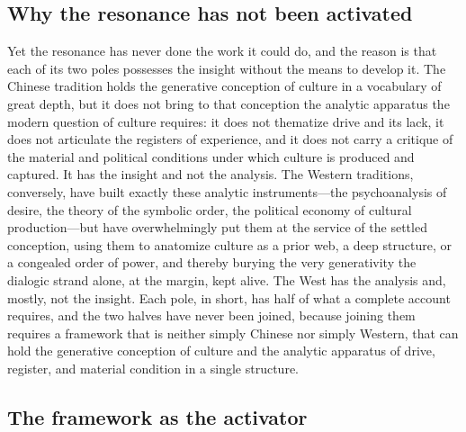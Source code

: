 \subsection*{Why the resonance has not been activated}

Yet the resonance has never done the work it could do, and the reason is that each of its two poles possesses the insight without the means to develop it. The Chinese tradition holds the generative conception of culture in a vocabulary of great depth, but it does not bring to that conception the analytic apparatus the modern question of culture requires: it does not thematize drive and its lack, it does not articulate the registers of experience, and it does not carry a critique of the material and political conditions under which culture is produced and captured. It has the insight and not the analysis. The Western traditions, conversely, have built exactly these analytic instruments---the psychoanalysis of desire, the theory of the symbolic order, the political economy of cultural production---but have overwhelmingly put them at the service of the settled conception, using them to anatomize culture as a prior web, a deep structure, or a congealed order of power, and thereby burying the very generativity the dialogic strand alone, at the margin, kept alive. The West has the analysis and, mostly, not the insight. Each pole, in short, has half of what a complete account requires, and the two halves have never been joined, because joining them requires a framework that is neither simply Chinese nor simply Western, that can hold the generative conception of culture and the analytic apparatus of drive, register, and material condition in a single structure.

\subsection*{The framework as the activator}

